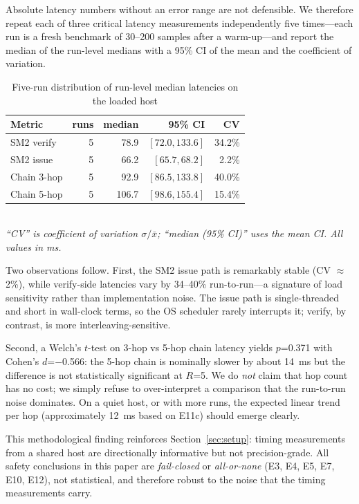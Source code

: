 \documentclass[10pt,twocolumn]{IEEEtran}
\begin{document}
Absolute latency numbers without an error range are not defensible.
We therefore repeat each of three critical latency measurements
independently five times---each run is a fresh benchmark of 30--200
samples after a warm-up---and report the median of the run-level
medians with a 95\% CI of the mean and the coefficient of variation.

\begin{table}[h!]
\caption{Five-run distribution of run-level median latencies on the loaded host}
\label{tab:e14}
\centering\small\setlength{\tabcolsep}{4pt}
\begin{tabular}{lrrrr}
  \toprule
  \textbf{Metric} & \textbf{runs} & \textbf{median} & \textbf{95\% CI} & \textbf{CV} \\
  \midrule
  SM2 verify       & 5 & 78.9  & $[72.0, 133.6]$ & 34.2\% \\
  SM2 issue        & 5 & 66.2  & $[65.7, 68.2]$  &  2.2\% \\
  Chain 3-hop      & 5 & 92.9  & $[86.5, 133.8]$ & 40.0\% \\
  Chain 5-hop      & 5 & 106.7 & $[98.6, 155.4]$ & 15.4\% \\
  \bottomrule
\end{tabular}
\vspace{2pt}\\
\textit{``CV'' is coefficient of variation $\sigma/\bar x$; ``median (95\% CI)'' uses the mean CI. All values in ms.}
\end{table}

Two observations follow. First, the SM2 issue path is remarkably
stable (CV $\approx$2\%), while verify-side latencies vary by
34--40\% run-to-run---a signature of load sensitivity rather than
implementation noise. The issue path is single-threaded and short
in wall-clock terms, so the OS scheduler rarely interrupts it;
verify, by contrast, is more interleaving-sensitive.

Second, a Welch's $t$-test on 3-hop vs 5-hop chain latency yields
$p$=0.371 with Cohen's $d$=$-$0.566: the 5-hop chain is nominally
slower by about 14~ms but the difference is not statistically
significant at $R$=5. We do \emph{not} claim that hop count has no
cost; we simply refuse to over-interpret a comparison that the
run-to-run noise dominates. On a quiet host, or with more runs,
the expected linear trend per hop (approximately 12~ms based on
E11c) should emerge clearly.

This methodological finding reinforces Section~\ref{sec:setup}:
timing measurements from a shared host are directionally informative
but not precision-grade. All safety conclusions in this paper are
\emph{fail-closed} or \emph{all-or-none} (E3, E4, E5, E7, E10,
E12), not statistical, and therefore robust to the noise that the
timing measurements carry.
\end{document}
